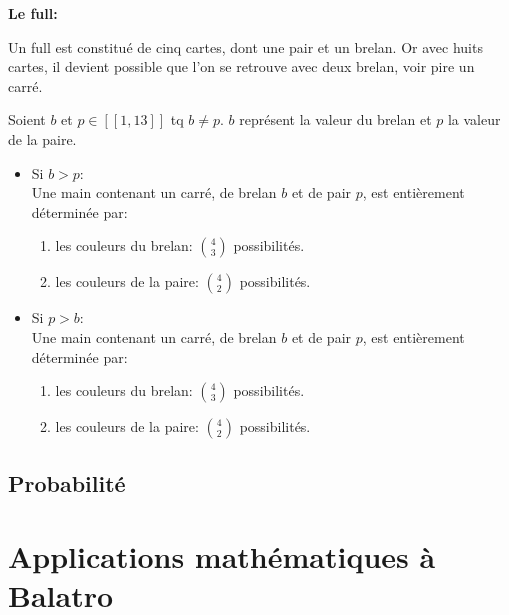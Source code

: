 \documentclass[10pt]{report}
\begin{document}
\begin{description}
        \item \textbf{Le full:}
        
        Un full est constitué de cinq cartes, dont une pair et un brelan.
        Or avec huits cartes, il devient possible que l'on se retrouve avec
        deux brelan, voir pire un carré.

        Soient $b$ et $p \in [\![1, 13]\!]$ tq $b \neq p$. $b$ représent la 
        valeur du brelan et $p$ la valeur de la paire.

        \begin{itemize}
            \item Si $b > p$:\\
            Une main contenant un carré, de brelan $b$ et de pair $p$, est
            entièrement déterminée par:
            \begin{enumerate}
                \item les couleurs du brelan: $\binom{4}{3}$ possibilités.
                \item les couleurs de la paire: $\binom{4}{2}$ possibilités.
            \end{enumerate}

            
            
            \item Si $p > b$:\\
            Une main contenant un carré, de brelan $b$ et de pair $p$, est
            entièrement déterminée par:
            \begin{enumerate}
                \item les couleurs du brelan: $\binom{4}{3}$ possibilités.
                \item les couleurs de la paire: $\binom{4}{2}$ possibilités.
            \end{enumerate}

        \end{itemize}
        

    \end{description}

    \newpage

    \section{Probabilité}   

    \chapter{Applications mathématiques à Balatro}
\end{document}
